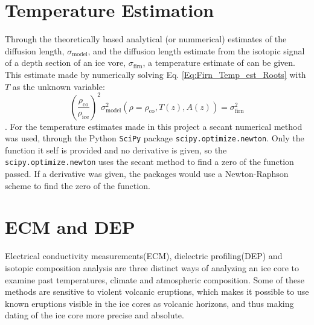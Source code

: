 \documentclass[../../CompleteThesis/Complete_1stDraft.tex]{subfiles}
\begin{document}
\section[Temperature Estimation]{Temperature Estimation}
\label{Sec:Ice_TempEstimation}
Through the theoretically based analytical (or nummerical) estimates of the diffusion length, $\sigma_{\text{model}}$, and the diffusion length estimate from the isotopic signal of a depth section of an ice vore, $\sigma_{\text{firn}}$, a temperature estimate of can be given. This estimate made by numerically solving Eq. \ref{Eq:Firn_Temp_est_Roots} with $T$ as the unknown variable:
\begin{equation}
	\left(\frac{\rho_{\text{co}}}{\rho_{\text{ice}}}\right)^2 \sigma_{\text{model}}^2(\rho=\rho_{\text{co}}, T(z), A(z)) = \sigma^2_{\text{firn}}
	\label{Eq:Firn_Temp_est_Roots2}
\end{equation}. For the temperature estimates made in this project a secant numerical method\cite{Press2007} was used, through the Python \lstinline[language=Python]|SciPy| package \lstinline[language=Python]|scipy.optimize.newton|. Only the function it self is provided and no derivative is given, so the \lstinline[language=Python]|scipy.optimize.newton| uses the secant method to find a zero of the function passed. If a derivative was given, the packages would use a Newton-Raphson\cite{Press2007} scheme to find the zero of the function.








\section[ECM and DEP][ECM and DEP]{ECM and DEP}
\label{Sec:Ice_ECMandDEP}
Electrical conductivity measurements(ECM), dielectric profiling(DEP) and isotopic composition analysis are three distinct ways of analyzing an ice core to examine past temperatures, climate and atmospheric composition. Some of these methods are sensitive to violent volcanic eruptions, which makes it possible to use known eruptions visible in the ice cores as volcanic horizons, and thus making dating of the ice core more precise and absolute.
\end{document}
